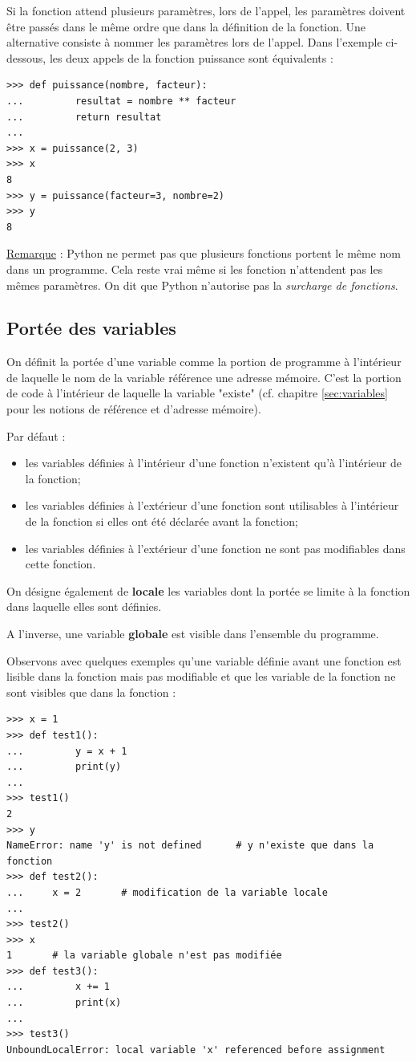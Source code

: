 \documentclass[12pt, a4paper]{article}
\begin{document}
Si la fonction attend plusieurs paramètres, lors de l'appel, les paramètres doivent être passés dans le même ordre que dans la définition de la fonction. Une alternative consiste à nommer les paramètres lors de l'appel. Dans l'exemple ci-dessous, les deux appels de la fonction puissance sont équivalents :
\begin{lstlisting}
>>> def puissance(nombre, facteur):
...			resultat = nombre ** facteur
... 		return resultat
...
>>> x = puissance(2, 3)
>>> x
8
>>> y = puissance(facteur=3, nombre=2)
>>> y
8
\end{lstlisting}

\underline{Remarque} : Python ne permet pas que plusieurs fonctions portent le même nom dans un programme. Cela reste vrai même si les fonction n'attendent pas les mêmes paramètres. On dit que Python n'autorise pas la \textit{surcharge de fonctions}.


\subsection{Portée des variables}
On définit la portée d'une variable comme la portion de programme à l'intérieur de laquelle le nom de la variable référence une adresse mémoire. C'est la portion de code à l'intérieur de laquelle la variable "existe" (cf. chapitre \ref{sec:variables} pour les notions de référence et d'adresse mémoire).

Par défaut :
\begin{itemize}
	\item les variables définies à l'intérieur d'une fonction n'existent qu'à l'intérieur de la fonction;
	\item les variables définies à l'extérieur d'une fonction sont utilisables à l'intérieur de la fonction si elles ont été déclarée avant la fonction;
	\item les variables définies à l'extérieur d'une fonction ne sont pas modifiables dans cette fonction.
\end{itemize}

On désigne également de \textbf{locale} les variables dont la portée se limite à la fonction dans laquelle elles sont définies.

A l'inverse, une variable \textbf{globale} est visible dans l'ensemble du programme.

Observons avec quelques exemples qu'une variable définie avant une fonction est lisible dans la fonction mais pas modifiable et que les variable de la fonction ne sont visibles que dans la fonction :
\begin{lstlisting}
>>> x = 1
>>> def test1():
...			y = x + 1
... 		print(y)
...
>>> test1()
2
>>> y
NameError: name 'y' is not defined		# y n'existe que dans la fonction
>>> def test2():
...     x = 2		# modification de la variable locale
...
>>> test2()
>>> x
1		# la variable globale n'est pas modifiée
>>> def test3():
...			x += 1
... 		print(x)
...
>>> test3()
UnboundLocalError: local variable 'x' referenced before assignment
\end{lstlisting}
\end{document}

